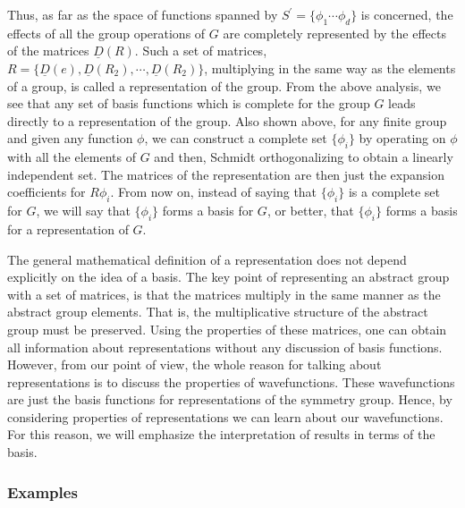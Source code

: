 Thus, as far as the space of functions spanned by $S^{\prime} = \{ 
\phi_1 \cdots \phi_d\}$ is concerned, the effects of all the group 
operations of $G$ are completely represented by the effects of the 
matrices $\underline{D}(R)$. Such a set of matrices, $R = \{ 
\underline{D}(e) , \underline{D}(R_2), \cdots , \underline{D} 
(R_2)\}$, multiplying in the same way as the elements of a group, is 
called a representation of the group.  From the above analysis, we see 
that any set of basis functions which is complete for the group $G$ 
leads directly to a representation of the group.  Also shown above, for 
any finite group and given any function $\phi$, we can construct a 
complete set $\{ \phi_i \}$ by operating on $\phi$ with all the 
elements of $G$ and then, Schmidt orthogonalizing to obtain a 
linearly independent set.  The matrices of the representation are then 
just the expansion coefficients for $R \phi_i$.  From now on, instead 
of saying that $\{ \phi_i\}$ is a complete set for $G$, we will say 
that $\{ \phi_i\}$ forms a basis for $G$, or better, that $\{ \phi_i\}$ 
forms a basis for a representation of $G$.

The general mathematical definition of a representation does not 
depend explicitly on the idea of a basis.  The key point of 
representing an abstract group with a set of matrices, is that the 
matrices multiply in the same manner as the abstract group elements.  
That is, the multiplicative structure of the abstract group must be 
preserved.  Using the properties of these matrices, one can obtain all 
information about representations without any discussion of basis 
functions.  However, from our point of view, the whole reason for 
talking about representations is to discuss the properties of 
wavefunctions.  These wavefunctions are just the basis functions for 
representations of the symmetry group.  Hence, by considering 
properties of representations we can learn about our wavefunctions.  
For this reason, we will emphasize the interpretation of results in 
terms of the basis.

\subsubsection{Examples}

